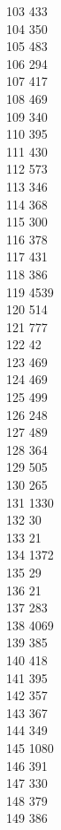 { 103	433 \\
 104	350 \\
 105	483 \\
 106	294 \\
 107	417 \\
 108	469 \\
 109	340 \\
 110	395 \\
 111	430 \\
 112	573 \\
 113	346 \\
 114	368 \\
 115	300 \\
 116	378 \\
 117	431 \\
 118	386 \\
 119	4539 \\
 120	514 \\
 121	777 \\
 122	42 \\
 123	469 \\
 124	469 \\
 125	499 \\
 126	248 \\
 127	489 \\
 128	364 \\
 129	505 \\
 130	265 \\
 131	1330 \\
 132	30 \\
 133	21 \\
 134	1372 \\
 135	29 \\
 136	21 \\
 137	283 \\
 138	4069 \\
 139	385 \\
 140	418 \\
 141	395 \\
 142	357 \\
 143	367 \\
 144	349 \\
 145	1080 \\
 146	391 \\
 147	330 \\
 148	379 \\
 149	386 \\
}
